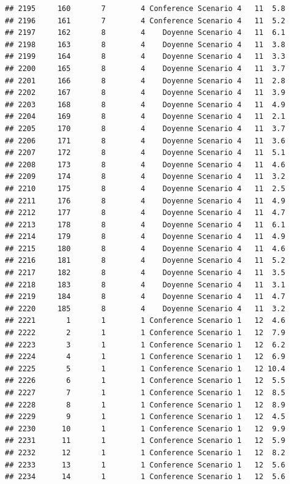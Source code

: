 \documentclass[
]{article}
\begin{document}
\begin{verbatim}
## 2195     160       7        4 Conference Scenario 4   11  5.8
## 2196     161       7        4 Conference Scenario 4   11  5.2
## 2197     162       8        4    Doyenne Scenario 4   11  6.1
## 2198     163       8        4    Doyenne Scenario 4   11  3.8
## 2199     164       8        4    Doyenne Scenario 4   11  3.3
## 2200     165       8        4    Doyenne Scenario 4   11  3.7
## 2201     166       8        4    Doyenne Scenario 4   11  2.8
## 2202     167       8        4    Doyenne Scenario 4   11  3.9
## 2203     168       8        4    Doyenne Scenario 4   11  4.9
## 2204     169       8        4    Doyenne Scenario 4   11  2.1
## 2205     170       8        4    Doyenne Scenario 4   11  3.7
## 2206     171       8        4    Doyenne Scenario 4   11  3.6
## 2207     172       8        4    Doyenne Scenario 4   11  5.1
## 2208     173       8        4    Doyenne Scenario 4   11  4.6
## 2209     174       8        4    Doyenne Scenario 4   11  3.2
## 2210     175       8        4    Doyenne Scenario 4   11  2.5
## 2211     176       8        4    Doyenne Scenario 4   11  4.9
## 2212     177       8        4    Doyenne Scenario 4   11  4.7
## 2213     178       8        4    Doyenne Scenario 4   11  6.1
## 2214     179       8        4    Doyenne Scenario 4   11  4.9
## 2215     180       8        4    Doyenne Scenario 4   11  4.6
## 2216     181       8        4    Doyenne Scenario 4   11  5.2
## 2217     182       8        4    Doyenne Scenario 4   11  3.5
## 2218     183       8        4    Doyenne Scenario 4   11  3.1
## 2219     184       8        4    Doyenne Scenario 4   11  4.7
## 2220     185       8        4    Doyenne Scenario 4   11  3.2
## 2221       1       1        1 Conference Scenario 1   12  4.6
## 2222       2       1        1 Conference Scenario 1   12  7.9
## 2223       3       1        1 Conference Scenario 1   12  6.2
## 2224       4       1        1 Conference Scenario 1   12  6.9
## 2225       5       1        1 Conference Scenario 1   12 10.4
## 2226       6       1        1 Conference Scenario 1   12  5.5
## 2227       7       1        1 Conference Scenario 1   12  8.5
## 2228       8       1        1 Conference Scenario 1   12  8.9
## 2229       9       1        1 Conference Scenario 1   12  4.5
## 2230      10       1        1 Conference Scenario 1   12  9.9
## 2231      11       1        1 Conference Scenario 1   12  5.9
## 2232      12       1        1 Conference Scenario 1   12  8.2
## 2233      13       1        1 Conference Scenario 1   12  5.6
## 2234      14       1        1 Conference Scenario 1   12  5.6

\end{verbatim}
\end{document}
